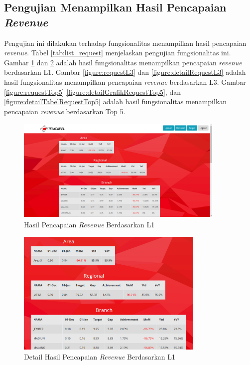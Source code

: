 \subsection{Pengujian Menampilkan Hasil Pencapaian \textit{Revenue}}
Pengujian ini dilakukan terhadap fungsionalitas menampilkan hasil pencapaian \textit{revenue}. Tabel \ref{tab:list_request} menjelaskan pengujian fungsionalitas ini. Gambar \ref{figure:requestL1} dan \ref{figure:detailRequestL1} adalah hasil fungsionalitas menampilkan pencapaian \textit{revenue} berdasarkan L1. Gambar \ref{figure:requestL3} dan \ref{figure:detailRequestL3} adalah hasil fungsionalitas menampilkan pencapaian \textit{revenue} berdasarkan L3. Gambar \ref{figure:requestTop5} \ref{figure:detailGrafikRequestTop5}, dan \ref{figure:detailTabelRequestTop5} adalah hasil fungsionalitas menampilkan pencapaian \textit{revenue} berdasarkan Top 5.

\begin{figure}[h!]
	\centerline
	{\includegraphics[width=10cm,height=5cm]{bab6/halamanL1.png}}
	\caption{Hasil Pencapaian \textit{Revenue} Berdasarkan L1}
	\label{figure:requestL1}
\end{figure}

\begin{figure}[h!]
	\centerline
	{\includegraphics[width=9cm,height=6cm]{bab6/detailHalamanL1.png}}
	\caption{Detail Hasil Pencapaian \textit{Revenue} Berdasarkan L1}
	\label{figure:detailRequestL1}
\end{figure}

